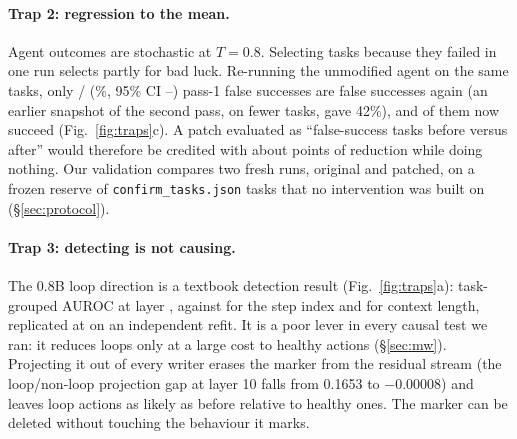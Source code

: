 \paragraph{Trap 2: regression to the mean.} Agent outcomes are stochastic at $T=0.8$. Selecting tasks because they failed in one run selects partly for bad luck. Re-running the unmodified agent on the same tasks, only \rtmFsAgain/\rtmFsN{} (\rtmFsAgainPct\%, 95\% CI \rtmFsAgainLo--\rtmFsAgainHi) pass-1 false successes are false successes again (an earlier snapshot of the second pass, on fewer tasks, gave 42\%), and \rtmFsSucc{} of them now succeed (Fig.~\ref{fig:traps}c). %
A patch evaluated as ``false-success tasks before versus after'' would therefore be credited with about \rtmFakeEffect{} points of reduction while doing nothing. Our validation compares two fresh runs, original and patched, on a frozen reserve of \texttt{confirm\_tasks.json} tasks that no intervention was built on (\S\ref{sec:protocol}).

\paragraph{Trap 3: detecting is not causing.} The 0.8B loop direction is a textbook detection result (Fig.~\ref{fig:traps}a): task-grouped AUROC \mwAucBestExact{} at layer \mwAucBestLayer, against \mwAucStep{} for the step index and \mwAucCtx{} for context length, replicated at \mwAstraAuc{} on an independent refit. It is a poor lever in every causal test we ran: it reduces loops only at a large cost to healthy actions (\S\ref{sec:mw}). Projecting it out of every writer erases the marker from the residual stream (the loop/non-loop projection gap at layer 10 falls from 0.1653 to $-0.00008$) and leaves loop actions as likely as before relative to healthy ones. %
The marker can be deleted without touching the behaviour it marks.

